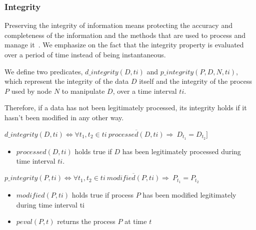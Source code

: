 \subsubsection{Integrity}
\label{sec:prop-int}
 Preserving the integrity of information means protecting the accuracy and completeness of the information and the methods that are used to process and manage it~\cite{ISO/IEC270012013}.
We emphasize on the fact that the integrity property is evaluated over a period of time instead of being instantaneous.

We define two predicates, $d\_integrity(D,ti)$ and $p\_integrity(P,D,N,ti)$, which represent  the integrity of the data $D$ itself and the integrity of the process $P$ used by node $N$ to manipulate $D$, over a time interval $ti$. 

Therefore, if a data has not been legitimately processed, its integrity holds if it hasn't been modified in any other way.
\begin{myformula}
$d\_integrity(D,ti) \Leftrightarrow \forall t_1,t_2\in ti ~ \overline{processed(D, ti)} \Rightarrow 
~D_{t_1}=D_{t_2}]$ 
\end{myformula}

\begin{itemize}
\item $processed(D, ti)$ holds true if $D$ has been legitimately processed during time interval $ti$.

\end{itemize}

\begin{myformula}
$p\_integrity(P, ti) \Leftrightarrow \forall t_1,t_2 \in ti~ \overline{modified(P, ti)}\Rightarrow 
~P_{t_1}=P_{t_2}$
\end{myformula}

\begin{itemize}
\item $modified(P,ti)$ holds true if process $P$ has been modified legitimately during time interval ti
\item $peval(P,t)$ returns the process $P$ at time $t$
\end{itemize}


